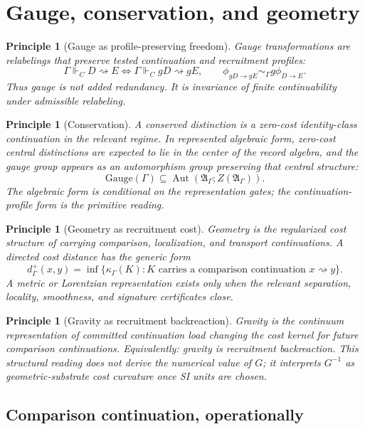 \documentclass[11pt]{article}
\newtheorem{principle}[theorem]{Principle}
\theoremstyle{remark}
\newcommand{\G}{\Gamma}
\newcommand{\entails}{\Vdash}
\newcommand{\goes}{\rightsquigarrow}
\newcommand{\Cost}{\kappa}
\newcommand{\Alg}{\mathfrak A}
\newcommand{\Aut}{\operatorname{Aut}}
\begin{document}
\section{Gauge, conservation, and geometry}

\begin{principle}[Gauge as profile-preserving freedom]
Gauge transformations are relabelings that preserve tested continuation and recruitment profiles:
\[
        \G\entails_C D\goes E
        \Longleftrightarrow
        \G\entails_C gD\goes gE,
        \qquad
        \phi_{gD\to gE}\sim_\G g\phi_{D\to E}.
\]
Thus gauge is not added redundancy.  It is invariance of finite continuability under admissible relabeling.
\end{principle}

\begin{principle}[Conservation]
A conserved distinction is a zero-cost identity-class continuation in the relevant regime.  In represented algebraic form, zero-cost central distinctions are expected to lie in the center of the record algebra, and the gauge group appears as an automorphism group preserving that central structure:
\[
        \mathrm{Gauge}(\G)\subseteq \Aut(\Alg_\G;Z(\Alg_\G)).
\]
The algebraic form is conditional on the representation gates; the continuation-profile form is the primitive reading.
\end{principle}

\begin{principle}[Geometry as recruitment cost]
Geometry is the regularized cost structure of carrying comparison, localization, and transport continuations.  A directed cost distance has the generic form
\[
        d^+_\G(x,y)=\inf\{\Cost_\G(K):K\text{ carries a comparison continuation }x\goes y\}.
\]
A metric or Lorentzian representation exists only when the relevant separation, locality, smoothness, and signature certificates close.
\end{principle}

\begin{principle}[Gravity as recruitment backreaction]
Gravity is the continuum representation of committed continuation load changing the cost kernel for future comparison continuations.  Equivalently: gravity is recruitment backreaction.  This structural reading does not derive the numerical value of \(G\); it interprets \(G^{-1}\) as geometric-substrate cost curvature once SI units are chosen.
\end{principle}

\subsection{Comparison continuation, operationally}
\end{document}
